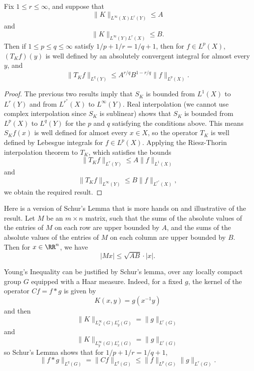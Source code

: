 \begin{theorem}
  Fix $1 \leq r \leq \infty$, and suppose that
  \[ \| K \|_{L^\infty(X) L^r(Y)} \leq A \]
  and
  \[ \| K \|_{L^\infty(Y) L^r(X)} \leq B. \]
  Then if $1 \leq p \leq q \leq \infty$ satisfy $1/p + 1/r = 1/q + 1$, then for $f \in L^p(X)$, $(T_K f)(y)$ is well defined by an absolutely convergent integral for almost every $y$, and
  \[ \| T_K f \|_{L^q(Y)} \leq A^{r/q} B^{1 - r/q} \| f \|_{L^p(X)}. \]
\end{theorem}
\begin{proof}
  The previous two results imply that $S_K$ is bounded from $L^1(X)$ to $L^r(Y)$ and from $L^{r^*}(X)$ to $L^\infty(Y)$. Real interpolation (we cannot use complex interpolation since $S_K$ is sublinear) shows that $S_K$ is bounded from $L^p(X)$ to $L^q(Y)$ for the $p$ and $q$ satisfying the conditions above. This means $S_K f(x)$ is well defined for almost every $x \in X$, so the operator $T_K$ is well defined by Lebesgue integrals for $f \in L^p(X)$. Applying the Riesz-Thorin interpolation theorem to $T_K$, which satisfies the bounds
  \[ \| T_K f \|_{L^r(Y)} \leq A \| f \|_{L^1(X)} \]
  and
  \[ \| T_K f \|_{L^\infty(Y)} \leq B \| f \|_{L^{r^*}(X)}, \]
  we obtain the required result.
\end{proof}

\begin{example}
    Here is a version of Schur's Lemma that is more hands on and illustrative of the result. Let $M$ be an $m \times n$ matrix, such that the sums of the absolute values of the entries of $M$ on each row are upper bounded by $A$, and the sums of the absolute values of the entries of $M$ on each column are upper bounded by $B$. Then for $x \in \RR^n$, we have
    \[ |Mx| \leq \sqrt{AB} \cdot |x|. \]
\end{example}

\begin{example}
    Young's Inequality can be justified by Schur's lemma, over any locally compact group $G$ equipped with a Haar measure. Indeed, for a fixed $g$, the kernel of the operator $Cf =  f * g$ is given by
    \[ K(x,y) = g(x^{-1} y) \]
    and then
    \[ \| K \|_{L^\infty_x(G) L^r_y(G)} = \| g \|_{L^r(G)} \]
    and
    \[ \| K \|_{L^\infty_y(G) L^r_x(G)} = \| g \|_{L^r(G)} \]
    so Schur's Lemma shows that for $1/p + 1/r = 1/q + 1$,
    \[ \| f * g \|_{L^q(G)} = \| Cf \|_{L^q(G)} \leq \| f \|_{L^p(G)} \| g \|_{L^r(G)}. \]
\end{example}


